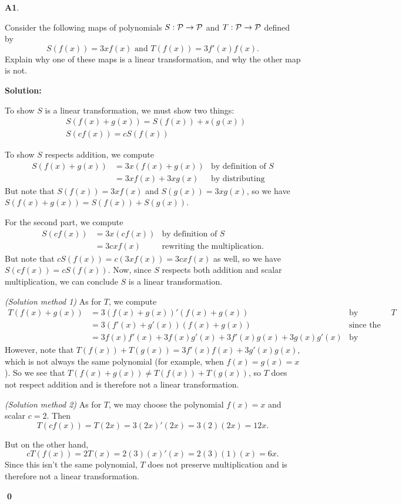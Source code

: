 \documentclass{article}
\newenvironment{problem}[1]
{
  \begin{flushleft}
  \textbf{#1}.
  \ignorespaces
}
{
  \end{flushleft}
}
\newenvironment{solution}
{
  \ignorespaces
  \textbf{Solution:}
}
{
  \ignorespacesafterend
  \begin{flushright}
  {\bfseries \qed}
  \end{flushright}
}
\begin{document}
\begin{problem}{A1}
Consider the following maps of polynomials \(S: \P \rightarrow \P\)
and \(T:\P\rightarrow\P\) defined by
\[S(f(x))= 3xf(x) \text{ and }T(f(x)) = 3f'(x)f(x).\]
Explain why one of these maps is a linear transformation, and why the other
map is not.
\end{problem}
\begin{solution}
To show \(S\) is a linear transformation, we must show two things:
\begin{align*}
&S\left(f(x)+g(x)\right)=S(f(x))+s(g(x)) \\
&S(cf(x)) = cS(f(x))
\end{align*}

To show \(S\) respects addition, we compute
\begin{align*}
S\left(f(x)+g(x)\right) &= 3x\left(f(x)+g(x)\right) & \text{by definition of \(S\)} \\
&= 3xf(x)+3xg(x) & \text{by distributing}
\end{align*}
But note that \(S(f(x))=3xf(x)\) and \(S(g(x))=3xg(x)\), so we have \(S(f(x)+g(x))=S(f(x))+S(g(x))\).

For the second part, we compute
\begin{align*}
S\left(cf(x)\right) &= 3x\left(cf(x)\right) & \text{by definition of \(S\)} \\
&= 3cxf(x) & \text{rewriting the multiplication.}
\end{align*}
But note that \(cS(f(x))=c(3xf(x))=3cxf(x)\) as well, so we have \(S(cf(x))=cS(f(x))\).  Now, since \(S\) respects both addition and scalar multiplication, we can conclude \(S\) is a linear transformation.

\textit{(Solution method 1)}
As for \(T\), we compute
  \begin{align*}
  T(f(x)+g(x))& =3 (f(x)+g(x))'(f(x)+g(x)) &\text{by definition of \(T\)} \\
  &= 3(f'(x)+g'(x))(f(x)+g(x)) & \text{since the derivative is linear} \\
  &= 3f(x)f'(x)+3f(x)g'(x)+3f'(x)g(x)+3g(x)g'(x) &\text{by distributing}
  \end{align*}
However, note that \(T(f(x))+T(g(x))=3f'(x)f(x)+3g'(x)g(x)\), which is not
always the same polynomial (for example, when \(f(x)=g(x)=x\)). 
So we see that \(T(f(x)+g(x)) \neq T(f(x))+T(g(x))\),
so \(T\) does not respect addition and is therefore not a linear transformation.

\textit{(Solution method 2)}
As for \(T\), we may choose the polynomial \(f(x)=x\) and scalar \(c=2\). Then
\[T(cf(x))=T(2x)=3(2x)'(2x)=3(2)(2x)=12x.\]

But on the other hand, \[cT(f(x))=2T(x)=2(3)(x)'(x)=2(3)(1)(x)=6x.\]
Since this isn't the same polynomial, \(T\) does not preserve multiplication
and is therefore not a linear transformation. 
\end{solution}
\end{document}
